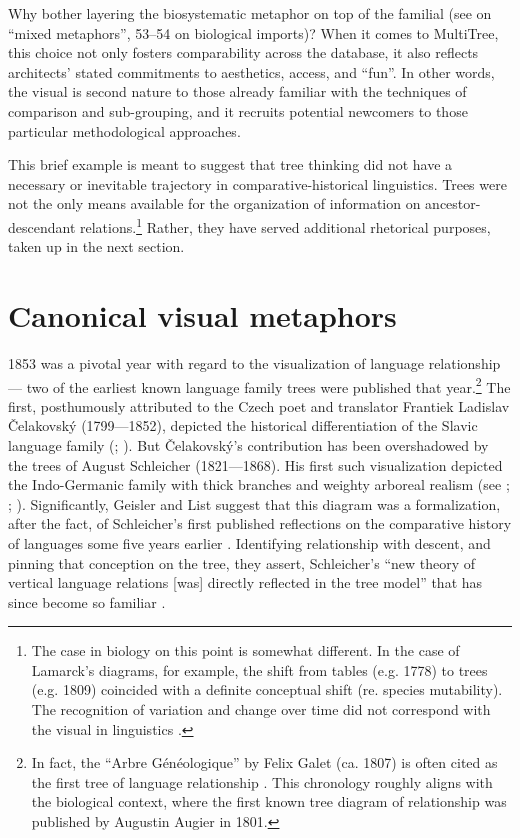 \documentclass[output=paper]{langscibook}
\begin{document}
Why bother layering the biosystematic metaphor on top of the familial (see \citealt[49]{Wells1987} on ``mixed metaphors'', 53--54 on biological imports)? When it comes to MultiTree, this choice not only fosters comparability across the database, it also reflects architects' stated commitments to aesthetics, access, and ``fun''. In other words, the visual is second nature to those already familiar with the techniques of comparison and sub-grouping, and it recruits potential newcomers to those particular methodological approaches.

This brief example is meant to suggest that tree thinking did not have a necessary or inevitable trajectory in comparative-historical linguistics. Trees were not the only means available for the organization of information on ancestor-descendant relations.\footnote{The case in biology on this point is somewhat different. In the case of Lamarck's diagrams, for example, the shift from tables (e.g. 1778) to trees (e.g. 1809) coincided with a definite conceptual shift (re. species mutability). The recognition of variation and change over time did not correspond with the visual in linguistics \citep[ch. 3]{Archibald2014}.} Rather, they have served additional rhetorical purposes, taken up in the next section.

\section{Canonical visual metaphors}
\label{sec:kaplan:visualmetaphors}

1853 was a pivotal year with regard to the visualization of language relationship — two of the earliest known language family trees were published that year.\footnote{In fact, the ``Arbre Généologique'' by Felix Galet (ca. 1807) is often cited as the first tree of language relationship \citep[242]{Hellstrom2012}. This chronology roughly aligns with the biological context, where the first known tree diagram of relationship was published by Augustin Augier in 1801.} The first, posthumously attributed to the Czech poet and translator Frantiek Ladislav Čelakovský (1799—1852), depicted the historical differentiation of the Slavic language family (\citealt[3]{Czelakovsky1853}; \citealt{Priestly1975}). But Čelakovský's contribution has been overshadowed by the trees of August Schleicher (1821—1868). His first such visualization depicted the Indo-Germanic family with thick branches and weighty arboreal realism (see \citealt{Maher1966}; \citealt{Hoenigswald1975}; \citealt{Koerner1987}). Significantly, Geisler and List suggest that this diagram was a formalization, after the fact, of Schleicher's first published reflections on the comparative history of languages some five years earlier \citep{Schleicher1848}. Identifying relationship with descent, and pinning that conception on the tree, they assert, Schleicher's ``new theory of vertical language relations [was] directly reflected in the tree model'' that has since become so familiar \citep[114]{GeislerList2013}.
\end{document}
